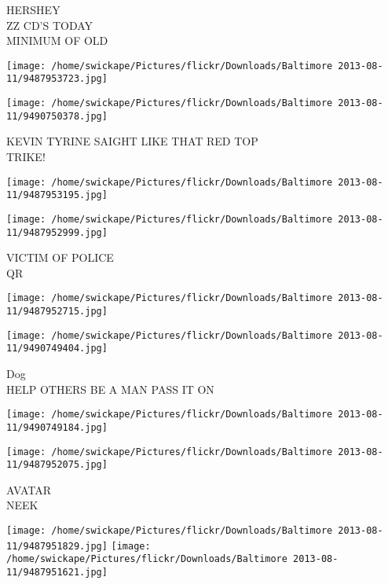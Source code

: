 \documentclass[10pt,letterpaper]{article}
\begin{document}
HERSHEY\\
ZZ CD'S TODAY\\
MINIMUM OF OLD\\
\pagebreak

\texttt{[image: /home/swickape/Pictures/flickr/Downloads/Baltimore 2013-08-11/9487953723.jpg]}

\vspace{0.25in}
\texttt{[image: /home/swickape/Pictures/flickr/Downloads/Baltimore 2013-08-11/9490750378.jpg]}

KEVIN TYRINE SAIGHT LIKE THAT RED TOP\\
TRIKE!\\
\pagebreak

\texttt{[image: /home/swickape/Pictures/flickr/Downloads/Baltimore 2013-08-11/9487953195.jpg]}

\vspace{0.25in}
\texttt{[image: /home/swickape/Pictures/flickr/Downloads/Baltimore 2013-08-11/9487952999.jpg]}

VICTIM OF POLICE\\
QR\\
\pagebreak

\texttt{[image: /home/swickape/Pictures/flickr/Downloads/Baltimore 2013-08-11/9487952715.jpg]}

\vspace{0.25in}
\texttt{[image: /home/swickape/Pictures/flickr/Downloads/Baltimore 2013-08-11/9490749404.jpg]}

Dog\\
HELP OTHERS BE A MAN PASS IT ON\\
\pagebreak

\texttt{[image: /home/swickape/Pictures/flickr/Downloads/Baltimore 2013-08-11/9490749184.jpg]}

\vspace{0.25in}
\texttt{[image: /home/swickape/Pictures/flickr/Downloads/Baltimore 2013-08-11/9487952075.jpg]}

AVATAR\\
NEEK\\
\pagebreak

\texttt{[image: /home/swickape/Pictures/flickr/Downloads/Baltimore 2013-08-11/9487951829.jpg]}
\texttt{[image: /home/swickape/Pictures/flickr/Downloads/Baltimore 2013-08-11/9487951621.jpg]}
\end{document}
